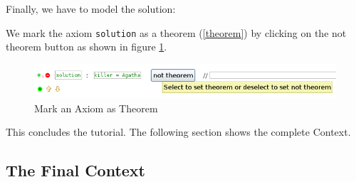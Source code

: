 Finally, we have to model the solution:


We mark the axiom \texttt{solution} as a theorem (\ref{theorem}) by clicking on the \textsf{not theorem} button as shown in figure \ref{fig_tut_05_mark_theorem}.

\begin{figure}[!h]
\begin{center}
	\includegraphics{img/tutorial/tut_05_agatha3.png}
	\caption{Mark an Axiom as Theorem}
	\label{fig_tut_05_mark_theorem}
\end{center}
\end{figure}


This concludes the tutorial. The following section shows the complete Context.

\subsection{The Final Context} \label{tut_05_final_context}

